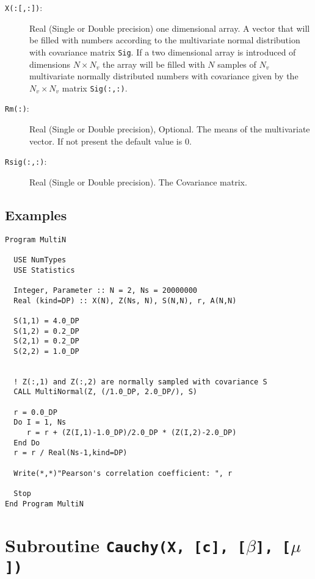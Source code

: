 \begin{description}
\item[\texttt{X(:[,:])}:] Real (Single or Double precision) one
  dimensional array. A vector that will be filled with numbers
  according to the multivariate normal distribution with covariance
  matrix \texttt{Sig}. If a two dimensional array is introduced of
  dimensions $N\times N_v$ the array will be filled with $N$ samples
  of $N_v$ multivariate normally distributed numbers with covariance
  given by the $N_v\times N_v$ matrix \texttt{Sig(:,:)}.
\item[\texttt{Rm(:)}:] Real (Single or Double precision), Optional. The
  means of the multivariate vector. If not present the default value
  is 0.
\item[\texttt{Rsig(:,:)}:] Real (Single or Double precision). The
  Covariance matrix. 
\end{description}

\subsection{Examples}

\begin{lstlisting}[emph=MultiNormal,
                   emphstyle=\color{blue},
                   frame=trBL,
                   caption=Sampling a multivariate normal distribution.,
                   label=multinormal]
Program MultiN

  USE NumTypes
  USE Statistics

  Integer, Parameter :: N = 2, Ns = 20000000
  Real (kind=DP) :: X(N), Z(Ns, N), S(N,N), r, A(N,N)

  S(1,1) = 4.0_DP
  S(1,2) = 0.2_DP
  S(2,1) = 0.2_DP
  S(2,2) = 1.0_DP


  ! Z(:,1) and Z(:,2) are normally sampled with covariance S
  CALL MultiNormal(Z, (/1.0_DP, 2.0_DP/), S)

  r = 0.0_DP
  Do I = 1, Ns
     r = r + (Z(I,1)-1.0_DP)/2.0_DP * (Z(I,2)-2.0_DP)
  End Do
  r = r / Real(Ns-1,kind=DP)
  
  Write(*,*)"Pearson's correlation coefficient: ", r

  Stop
End Program MultiN
\end{lstlisting}



\section{Subroutine \texttt{Cauchy(X, [c], [$\beta$], [$\mu$])}}

